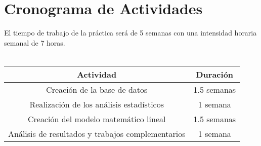 \documentclass[11pt, oneside]{article}
\theoremstyle{definition}
\theoremstyle{remark}
\begin{document}
\section{Cronograma de Actividades}
El tiempo de trabajo de la práctica será de 5 semanas con una intensidad horaria semanal de 7 horas. \\ \quad \\
\begin{tabular}{|c|c|}
	\hline
	\textbf{Actividad} & \textbf{Duración} \\
	\hline \hline
	Creación de la base de datos & 1.5 semanas \\
	\hline
	Realización de los análisis estadísticos & 1 semana \\
	\hline
	Creación del modelo matemático lineal & 1.5 semanas \\
	\hline
	Análisis de resultados y trabajos complementarios & 1 semana \\
	\hline
\end{tabular}

\end{document}
